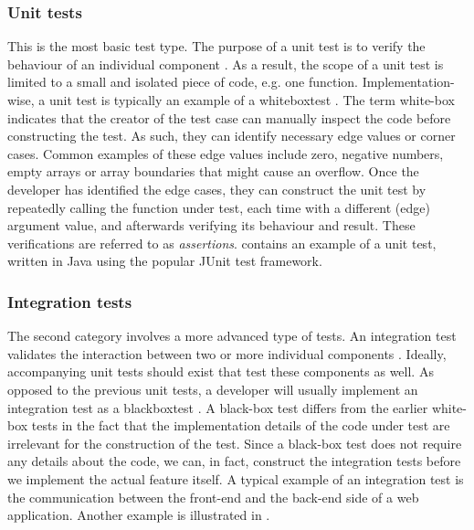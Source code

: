 \subsubsection{Unit tests}
This is the most basic test type. The purpose of a unit test is to verify the behaviour of an individual component \cite{whittaker2000}. As a result, the scope of a unit test is limited to a small and isolated piece of code, e.g. one function. Implementation-wise, a unit test is typically an example of a \gls{whiteboxtest} \cite[p.~12]{6588537}. The term white-box indicates that the creator of the test case can manually inspect the code before constructing the test. As such, they can identify necessary edge values or corner cases. Common examples of these edge values include zero, negative numbers, empty arrays or array boundaries that might cause an overflow. Once the developer has identified the edge cases, they can construct the unit test by repeatedly calling the function under test, each time with a different (edge) argument value, and afterwards verifying its behaviour and result. These verifications are referred to as \emph{assertions}.  contains an example of a unit test, written in Java using the popular JUnit test framework.
	


\subsubsection{Integration tests}
The second category involves a more advanced type of tests. An integration test validates the interaction between two or more individual components \cite{whittaker2000}. Ideally, accompanying unit tests should exist that test these components as well. As opposed to the previous unit tests, a developer will usually implement an integration test as a \gls{blackboxtest} \cite[p.~6]{6588537}. A black-box test differs from the earlier white-box tests in the fact that the implementation details of the code under test are irrelevant for the construction of the test. Since a black-box test does not require any details about the code, we can, in fact, construct the integration tests before we implement the actual feature itself. A typical example of an integration test is the communication between the front-end and the back-end side of a web application. Another example is illustrated in .
	
